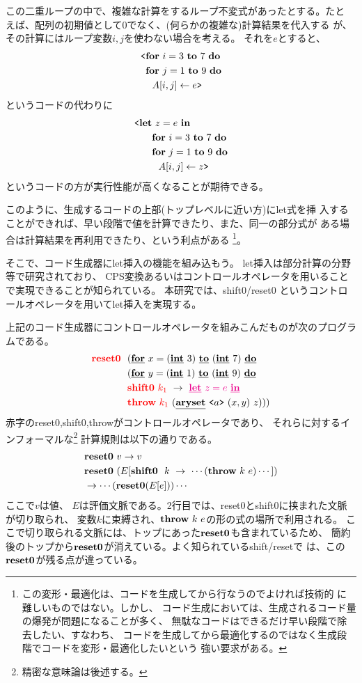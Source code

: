 この二重ループの中で、複雑な計算をするループ不変式があったとする。たと
えば、配列の初期値として$0$でなく、(何らかの複雑な)計算結果を代入する
が、その計算にはループ変数$i,j$を使わない場合を考える。
それを$e$とすると、
\begin{align*}
& \codebegin \forin{i=3}{7} \\
& \phantom{\codebegin} \forin{j=1}{9} \\
& \phantom{\codebegin} ~~\aryset{A}{i,j}{e} \codeend
\end{align*}
というコードの代わりに
\begin{align*}
& \codebegin \Let~z=e~\In \\
& \phantom{\codebegin \Let} \forin{i=3}{7} \\
& \phantom{\codebegin \Let} \forin{j=1}{9} \\
& \phantom{\codebegin \Let} ~~\aryset{A}{i,j}{z} \codeend
\end{align*}
というコードの方が実行性能が高くなることが期待できる。

このように、生成するコードの上部(トップレベルに近い方)にlet式を挿
入することができれば、早い段階で値を計算できたり、また、同一の部分式が
ある場合は計算結果を再利用できたり、という利点がある%
\footnote{この変形・最適化は、コードを生成してから行なうのでよければ技術的
に難しいものではない。しかし、
コード生成においては、生成されるコード量の爆発が問題になることが多く、
無駄なコードはできるだけ早い段階で除去したい、すなわち、
コードを生成してから最適化するのではなく生成段階でコードを変形・最適化したいという
強い要求がある。}。

そこで、コード生成器にlet挿入の機能を組み込もう。
let挿入は部分計算の分野等で研究されており、
CPS変換あるいはコントロールオペレータを用いることで実現できることが知られている。
本研究では、shift0/reset0 というコントロールオペレータを用いてlet挿入を実現する。

上記のコード生成器にコントロールオペレータを組みこんだものが次のプログラムである。
\begin{align*}
&\red{\Resetz} ~~(\cforin{x=(\cint~3)}{(\cint~7)} \\
&\phantom{\Resetz} ~~(\cforin{y=(\cint~1)}{(\cint~9)} \\
&\phantom{\Resetz} ~~\red{\Shiftz}~\red{k_1}~\to~ \magenta{\cLet~z=e~\cIn} \\
&\phantom{\Resetz} ~~\red{\Throw}~\red{k_1}~(\caryset{\code{a}}{(x,y)}{z})))
\end{align*}
赤字のreset0,shift0,throwがコントロールオペレータであり、
それらに対するインフォーマルな\footnote{精密な意味論は後述する。}%
計算規則は以下の通りである。
\begin{align*}
& \textbf{reset0} ~v \to v \\
& \textbf{reset0} ~(E[\textbf{shift0}~~k~\to~\cdots(\textbf{throw}~k~e)\cdots]) \\
& \to \cdots(\textbf{reset0}(E[e]))\cdots
\end{align*}
ここで$v$は値、
$E$は評価文脈である。2行目では、reset0とshift0に挟まれた文脈が切り取られ、
変数$k$に束縛され、$\textbf{throw}~k~e$の形の式の場所で利用される。
ここで切り取られる文脈には、トップにあった$\textbf{reset0}$も含まれているため、
簡約後のトップから$\textbf{reset0}$が消えている。よく知られているshift/resetで
は、この$\textbf{reset0}$が残る点が違っている。


